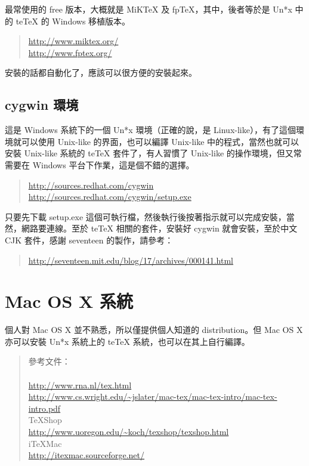 最常使用的 free 版本，大概就是 MiK\TeX{} 及 fp\TeX{}，其中，後者等於是 Un*x 中的 te\TeX{} 的 Windows 移植版本。

\begin{quote}
   \url{http://www.miktex.org/}  \\
   \url{http://www.fptex.org/}
\end{quote}

安裝的話都自動化了，應該可以很方便的安裝起來。

\subsection{cygwin 環境}

這是 Windows 系統下的一個 Un*x 環境（正確的說，是 Linux-like），有了這個環境就可以使用 Unix-like 的界面，也可以編譯 Unix-like 中的程式，當然也就可以安裝 Unix-like 系統的 te\TeX{} 套件了，有人習慣了 Unix-like 的操作環境，但又常需要在 Windows 平台下作業，這是個不錯的選擇。

\begin{quote}
   \url{http://sources.redhat.com/cygwin}            \\
   \url{http://sources.redhat.com/cygwin/setup.exe}
\end{quote}

只要先下載 {\ttfamily setup.exe} 這個可執行檔，然後執行後按著指示就可以完成安裝，當然，網路要連線。至於 te\TeX{} 相關的套件，安裝好 cygwin 就會安裝，至於中文 \textsf{CJK} 套件，感謝 seventeen 的製作，請參考：

\begin{quote}
   \url{http://seventeen.mit.edu/blog/17/archives/000141.html}
\end{quote}


\section{Mac OS X 系統}

個人對 Mac OS X 並不熟悉，所以僅提供個人知道的 distribution。但 Mac OS X 亦可以安裝 Un*x 系統上的 te\TeX{} 系統，也可以在其上自行編譯。

\begin{quote}
   參考文件：\\
   \\
   \url{http://www.rna.nl/tex.html}\\
   \url{http://www.cs.wright.edu/~jslater/mac-tex/mac-tex-intro/mac-tex-intro.pdf}\\
   \TeX{}Shop\\
   \url{http://www.uoregon.edu/~koch/texshop/texshop.html}\\
   i\TeX{}Mac\\
   \url{http://itexmac.sourceforge.net/}
\end{quote}

